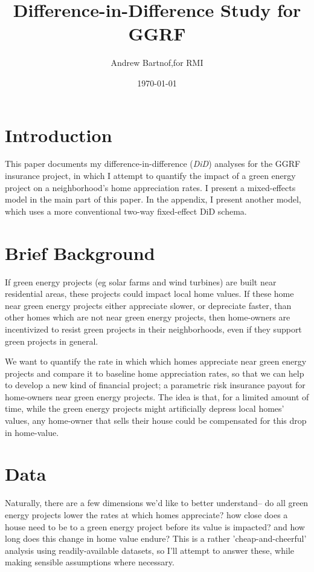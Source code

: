 \documentclass{article}
\begin{document}
\author{Andrew Bartnof,for RMI}
\title{Difference-in-Difference Study for GGRF}
\date{\today}
\maketitle

\section{Introduction}

This paper documents my difference-in-difference (\emph{DiD}) analyses for the GGRF insurance project, in which I attempt to quantify the impact of a green energy project on a neighborhood's home appreciation rates.
I present a mixed-effects model in the main part of this paper.
In the appendix, I present another model, which uses a more conventional two-way fixed-effect DiD schema.

\section{Brief Background}

If green energy projects (eg solar farms and wind turbines) are built near residential areas, these projects could impact local home values.
If these home near green energy projects either appreciate slower, or depreciate faster, than other homes which are not near green energy projects, then home-owners are incentivized to resist green projects in their neighborhoods, even if they support green projects in general.

We want to quantify the rate in which which homes appreciate near green energy projects and compare it to baseline home appreciation rates, so that we can help to develop a new kind of financial project; a parametric risk insurance payout for home-owners near green energy projects.
The idea is that, for a limited amount of time, while the green energy projects might artificially depress local homes' values, any home-owner that sells their house could be compensated for this drop in home-value.


\section{Data}

Naturally, there are a few dimensions we'd like to better understand-- do all green energy projects lower the rates at which homes appreciate? how close does a house need to be to a green energy project before its value is impacted? and how long does this change in home value endure?
This is a rather 'cheap-and-cheerful' analysis using readily-available datasets, so I'll attempt to answer these, while making sensible assumptions where necessary.
\end{document}
